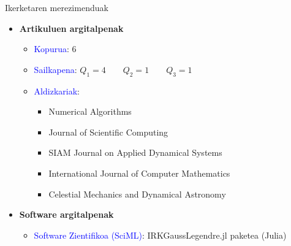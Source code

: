\documentclass[
 10pt,%
 compress,%
 t,       %
 xcolor=svgnames
]{beamer}
\theoremstyle{definition} \newtheorem{definicion}{Definicion}[section]
\theoremstyle{propiedades} \newtheorem{propiedades}{Propiedades}[section]
\begin{document}

\begin{frame}{Ikerketaren merezimenduak} 
	
	\medskip
	
\begin{itemize}
	\item 	\textbf{Artikuluen argitalpenak}
	
    \medskip
    
	\small

\begin{itemize}
	\item \textcolor{blue}{Kopurua}: 6
	
	\medskip
	\item \textcolor{blue}{Sailkapena}:
		$Q_1=4 \qquad Q_2=1 \qquad Q_3=1$

	
	\medskip
	\item \textcolor{blue}{Aldizkariak}:
	\begin{itemize}
		\item Numerical Algorithms
		\item Journal of Scientific Computing
		\item SIAM Journal on Applied Dynamical Systems
		\item International Journal of Computer Mathematics
		\item Celestial Mechanics and Dynamical Astronomy
	\end{itemize}
	
\end{itemize}

\medskip

\item \textbf{Software argitalpenak}

\medskip
\begin{itemize}
	\item \textcolor{blue}{Software Zientifikoa (SciML)}: IRKGaussLegendre.jl paketea (Julia)
\end{itemize}

\end{itemize}


\note[item]{

}
\end{frame}
\end{document}
